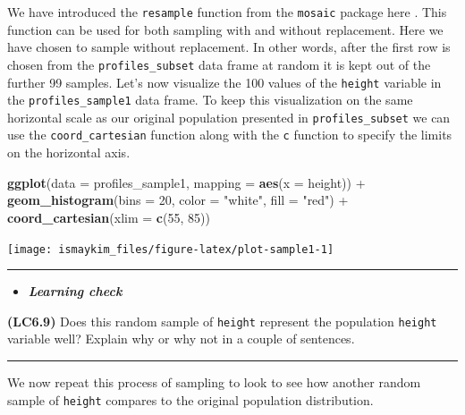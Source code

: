 \documentclass[]{tufte-book}
\newenvironment{Shaded}{\begin{snugshade}}{\end{snugshade}}
\newcommand{\KeywordTok}[1]{\textcolor[rgb]{0.13,0.29,0.53}{\textbf{{#1}}}}
\newcommand{\DataTypeTok}[1]{\textcolor[rgb]{0.13,0.29,0.53}{{#1}}}
\newcommand{\DecValTok}[1]{\textcolor[rgb]{0.00,0.00,0.81}{{#1}}}
\newcommand{\StringTok}[1]{\textcolor[rgb]{0.31,0.60,0.02}{{#1}}}
\newcommand{\NormalTok}[1]{{#1}}
\let\oldrule=\rule
\renewcommand{\rule}[1]{\oldrule{\linewidth}}
\newenvironment{rmdblock}[1]
  {\begin{shaded*}
  \begin{itemize}
  \renewcommand{\labelitemi}{
    \raisebox{-.7\height}[0pt][0pt]{
    }
  }
  \item
  }
  {
  \end{itemize}
  \end{shaded*}
  }
\newenvironment{learncheck}
  {\begin{rmdblock}{warning}}
  {\end{rmdblock}}
\begin{document}
We have introduced the \texttt{resample} function from the
\texttt{mosaic} package here \citep{R-mosaic}. This function can be used
for both sampling with and without replacement. Here we have chosen to
sample without replacement. In other words, after the first row is
chosen from the \texttt{profiles\_subset} data frame at random it is
kept out of the further 99 samples. Let's now visualize the 100 values
of the \texttt{height} variable in the \texttt{profiles\_sample1} data
frame. To keep this visualization on the same horizontal scale as our
original population presented in \texttt{profiles\_subset} we can use
the \texttt{coord\_cartesian} function along with the \texttt{c}
function to specify the limits on the horizontal axis.

\begin{Shaded}
\begin{Highlighting}[]
\KeywordTok{ggplot}\NormalTok{(}\DataTypeTok{data =} \NormalTok{profiles_sample1, }\DataTypeTok{mapping =} \KeywordTok{aes}\NormalTok{(}\DataTypeTok{x =} \NormalTok{height)) +}
\StringTok{  }\KeywordTok{geom_histogram}\NormalTok{(}\DataTypeTok{bins =} \DecValTok{20}\NormalTok{, }\DataTypeTok{color =} \StringTok{"white"}\NormalTok{, }\DataTypeTok{fill =} \StringTok{"red"}\NormalTok{) +}
\StringTok{  }\KeywordTok{coord_cartesian}\NormalTok{(}\DataTypeTok{xlim =} \KeywordTok{c}\NormalTok{(}\DecValTok{55}\NormalTok{, }\DecValTok{85}\NormalTok{))}
\end{Highlighting}
\end{Shaded}

\begin{center}\texttt{[image: ismaykim\_files/figure-latex/plot-sample1-1]} \end{center}

\begin{center}\rule{0.5\linewidth}{\linethickness}\end{center}

\begin{learncheck}
\textbf{\emph{Learning check}}
\end{learncheck}

\textbf{(LC6.9)} Does this random sample of \texttt{height} represent
the population \texttt{height} variable well? Explain why or why not in
a couple of sentences.

\begin{center}\rule{0.5\linewidth}{\linethickness}\end{center}

We now repeat this process of sampling to look to see how another random
sample of \texttt{height} compares to the original population
distribution.
\end{document}
